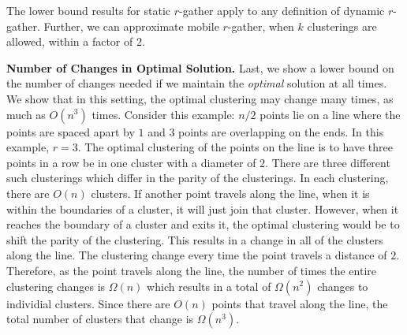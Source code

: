 \begin{theorem}
The lower bound results for static $r$-gather apply to any definition of dynamic $r$-gather.  Further, we can approximate mobile $r$-gather, when $k$ clusterings are allowed, within a factor of $2$.
\end{theorem}

\medskip\noindent\textbf{Number of Changes in Optimal Solution.} Last, we show a lower bound on the number of changes needed if we maintain the \emph{optimal} solution at all times. We show that in this setting, the optimal clustering may change many times, as much as $O(n^3)$ times.  Consider this example: $n/2$ points lie on a line where the points are spaced apart by $1$ and $3$ points are overlapping on the ends.  In this example, $r = 3$.  The optimal clustering of the points on the line is to have three points in a row be in one cluster with a diameter of $2$.  There are three different such clusterings which differ in the parity of the clusterings.  In each clustering, there are $O(n)$ clusters.  If another point travels along the line, when it is within the boundaries of a cluster, it will just join that cluster.  However, when it reaches the boundary of a cluster and exits it, the optimal clustering would be to shift the parity of the clustering.  This results in a change in all of the clusters along the line.  The clustering change every time the point travels a distance of $2$.  Therefore, as the point travels along the line, the number of times the entire clustering changes is $\Omega(n)$ which results in a total of $\Omega(n^2)$ changes to individial clusters.  Since there are $O(n)$ points that travel along the line, the total number of clusters that change is $\Omega(n^3)$.





